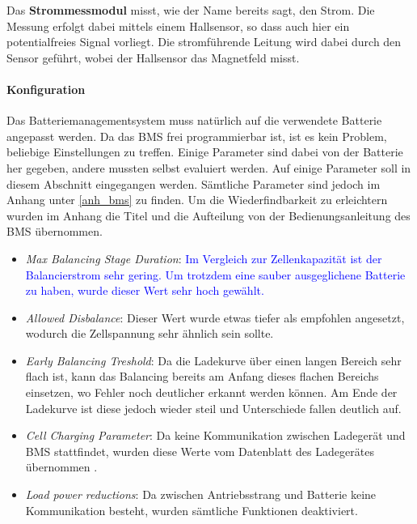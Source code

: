 Das \textbf{Strommessmodul} misst, wie der Name bereits sagt, den Strom. Die Messung erfolgt dabei mittels einem Hallsensor, so dass auch hier ein potentialfreies Signal vorliegt. Die stromführende Leitung wird dabei durch den Sensor geführt, wobei der Hallsensor das Magnetfeld misst.

\paragraph{Konfiguration}
Das Batteriemanagementsystem muss natürlich auf die verwendete Batterie angepasst werden. Da das BMS frei programmierbar ist, ist es kein Problem, beliebige Einstellungen zu treffen. Einige Parameter sind dabei von der Batterie her gegeben, andere mussten selbst evaluiert werden. Auf einige Parameter soll in diesem Abschnitt eingegangen werden. Sämtliche Parameter sind jedoch im Anhang unter \ref{anh_bms} zu finden. Um die Wiederfindbarkeit zu erleichtern wurden im Anhang die Titel und die Aufteilung von der Bedienungsanleitung des BMS \cite{bms} übernommen. \begin{itemize}
	\item \textit{Max Balancing Stage Duration}: \textcolor{blue}{Im Vergleich zur Zellenkapazität ist der Balancierstrom sehr gering. Um trotzdem eine sauber ausgeglichene Batterie zu haben, wurde dieser Wert sehr hoch gewählt.}
	\item \textit{Allowed Disbalance}: Dieser Wert wurde etwas tiefer als empfohlen angesetzt, wodurch die Zellspannung sehr ähnlich sein sollte.
	\item \textit{Early Balancing Treshold}: Da die Ladekurve über einen langen Bereich sehr flach ist, kann das Balancing bereits am Anfang dieses flachen Bereichs einsetzen, wo Fehler noch deutlicher erkannt werden können. Am Ende der Ladekurve ist diese jedoch wieder steil und Unterschiede fallen deutlich auf.
	\item \textit{Cell Charging Parameter}: Da keine Kommunikation zwischen Ladegerät und BMS stattfindet, wurden diese Werte vom Datenblatt des Ladegerätes übernommen \cite{ladegeraet}.
	\item \textit{Load power reductions}: Da zwischen Antriebsstrang und Batterie keine Kommunikation besteht, wurden sämtliche Funktionen deaktiviert.
\end{itemize}